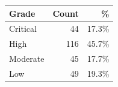 \begin{tabular}{@{}lrr@{}}
\toprule
Grade & Count & \% \\
\midrule
Critical & 44 & 17.3\% \\
High & 116 & 45.7\% \\
Moderate & 45 & 17.7\% \\
Low & 49 & 19.3\% \\
\bottomrule
\end{tabular}

